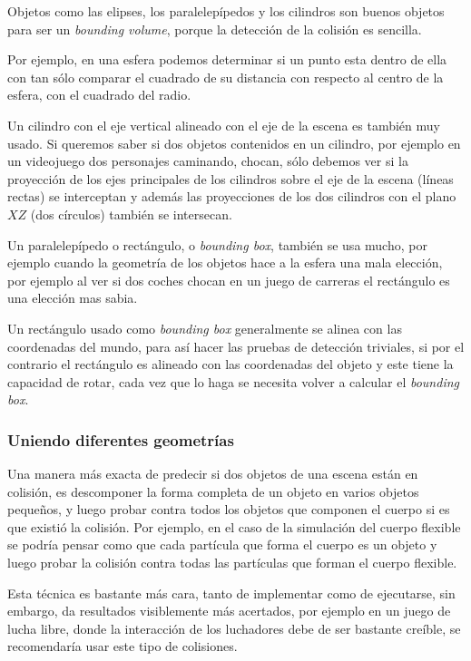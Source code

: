 Objetos como las elipses, los paralelepípedos y los cilindros son buenos objetos para ser un \foreignlanguage{english}{\emph{bounding volume}}, porque la detección de la colisión es sencilla.

Por ejemplo, en una esfera podemos determinar si un punto esta dentro de ella con tan sólo comparar el cuadrado de su distancia con respecto al centro de la esfera, con el cuadrado del radio. 

Un cilindro con el eje vertical alineado con el eje de la escena es también muy usado. Si queremos saber si dos objetos contenidos en un cilindro, por ejemplo en un videojuego dos personajes caminando, chocan, sólo debemos ver si la proyección de los ejes principales de los cilindros sobre el eje de la escena (líneas rectas) se interceptan y además las proyecciones de los dos cilindros con el plano $XZ$ (dos círculos) también se intersecan.

Un paralelepípedo o rectángulo, o \foreignlanguage{english}{\emph{bounding box}}, también se usa mucho, por ejemplo cuando la geometría de los objetos hace a la esfera una mala elección, por ejemplo al ver si dos coches chocan en un juego de carreras el rectángulo es una elección mas sabia.

Un rectángulo usado como \foreignlanguage{english}{\emph{bounding box}} generalmente se alinea con las coordenadas del mundo, para así hacer las pruebas de detección triviales, si  por el contrario el rectángulo es alineado con las coordenadas del objeto y este tiene la capacidad de rotar, cada vez que lo haga se necesita volver a calcular el  \foreignlanguage{english}{\emph{bounding box}}.
\subsubsection{Uniendo diferentes geometrías}
Una manera más exacta de predecir si dos objetos de una escena están en colisión, es descomponer la forma completa de un objeto en varios objetos pequeños, y luego probar contra todos los objetos que componen el cuerpo si es que existió la colisión. Por ejemplo, en el caso de la simulación del cuerpo flexible se podría pensar como que cada partícula que forma el cuerpo es un objeto y luego probar la colisión contra todas las partículas que forman el cuerpo flexible.

Esta técnica es bastante más cara, tanto de implementar como de ejecutarse, sin embargo, da resultados visiblemente más acertados, por ejemplo en un juego de lucha libre, donde la interacción de los luchadores debe de ser bastante creíble, se recomendaría usar este tipo de colisiones.

